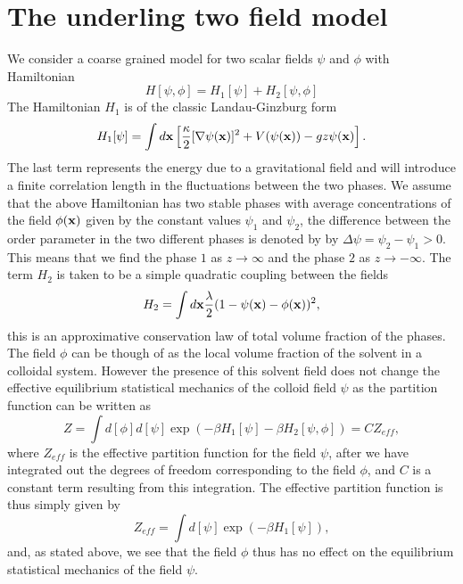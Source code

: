     \section{The underling two field  model}

We consider a coarse grained model for two scalar fields $\psi$ and $\phi$ with Hamiltonian
\begin{equation}
    H[\psi,\phi] = H_1[\psi] +H_2[\psi,\phi]
\end{equation}
The Hamiltonian $H_1$ is of the classic Landau-Ginzburg form
\begin{equation}
    H_1[\psi]=\int d{\bf x}\left[\frac{\kappa}{2}[\nabla\psi({\bf x})]^2 + V(\psi({\bf x}))
- gz \psi({\bf x})\right].
\end{equation}
The last term represents the energy due to a gravitational field and will introduce a finite correlation length in the fluctuations between the two phases. We assume that the above Hamiltonian has two stable phases with average concentrations of the field $\phi({\bf x})$ given by the constant values $\psi_1$ and $\psi_2$, the difference between the order parameter in  the two different phases is denoted by 
by $\Delta\psi= \psi_2 -\psi_1>0$. This means that we find the phase $1$ as $z\to\infty$ and the phase $2$ as $z\to-\infty$. The term $H_2$ is taken to be a simple quadratic coupling between the fields
\begin{equation}
    H_2 =\int d{\bf x} \frac{\lambda}{2}(1-\psi({\bf x})-\phi({\bf x}))^2,
\end{equation}
this is an approximative conservation law of total volume fraction of the phases. The field $\phi$ can be though of as the local volume fraction of the solvent in a colloidal system. However the presence of this solvent field does not change the effective equilibrium statistical mechanics of the colloid field $\psi$ as the partition function can be written as 
\begin{equation}
    Z = \int d[\phi]d[\psi]\exp(-\beta H_1[\psi]- \beta H_2[\psi,\phi]) = CZ_{eff},
\end{equation}
where $Z_{eff}$ is the effective partition function for the field $\psi$, after we have integrated out the degrees of freedom corresponding to the field $\phi$,
and $C$ is a constant term resulting from this integration. The effective partition function is thus simply given by
\begin{equation}
    Z_{eff} = \int d[\psi]\exp(-\beta H_1[\psi]),
\end{equation}
and, as stated above, we see that the field $\phi$ thus has no effect on the equilibrium statistical mechanics of the field $\psi$.

